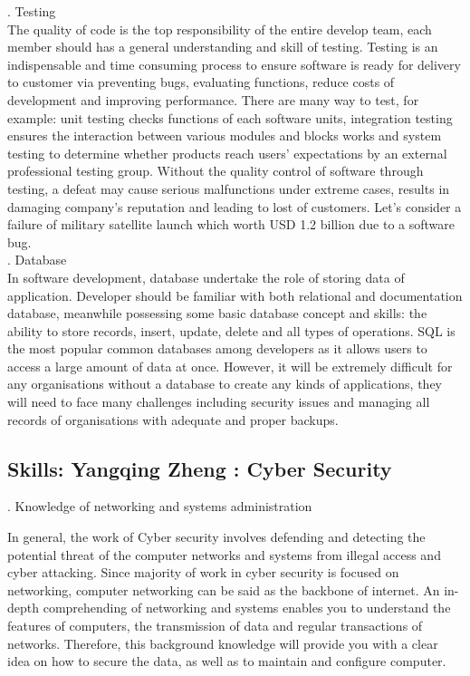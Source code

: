 \documentclass[a4paper, 11pt]{report}
\begin{document}
. Testing \\
\noindent The quality of code is the top responsibility of the entire develop team, each member should has a general understanding and skill of testing. Testing is an indispensable and time consuming process to ensure software is ready for delivery to customer via preventing bugs, evaluating functions, reduce costs of development and improving performance. There are many way to test, for example: unit testing checks functions of each software units, integration testing ensures the interaction between various modules and blocks works and system testing to determine whether products reach users' expectations by an external professional testing group.\cite{SDM} Without the quality control of software through testing, a defeat may cause serious malfunctions under extreme cases, results in damaging company's reputation and leading to lost of customers. Let's consider a failure of military satellite launch which worth USD 1.2 billion due to a software bug.\\

. Database\\
\noindent In software development, database undertake the role of storing data of application. Developer should be familiar with both relational and documentation database, meanwhile possessing some basic database concept and skills: the ability to store records, insert, update, delete and all types of operations. SQL is the most popular common databases among developers as it allows users to access a large amount of data at once. However, it will be extremely difficult for any organisations without a database to create any kinds of applications, they will need to face many challenges including security issues and managing all records of organisations with adequate and proper backups.\cite{database_importance}\\


\subsection{Skills: Yangqing Zheng : Cyber Security}

. Knowledge of networking and systems administration

\noindent In general, the work of Cyber security involves defending and detecting the potential threat of the computer networks and systems from illegal access and cyber attacking. Since majority of work in cyber security is focused on networking, computer networking can be said as the backbone of internet. An in-depth comprehending of networking and systems enables you to understand the features of computers, the transmission of data and regular transactions of networks. Therefore, this background knowledge will provide you with a clear idea on how to secure the data, as well as to maintain and configure computer. \\
\end{document}
